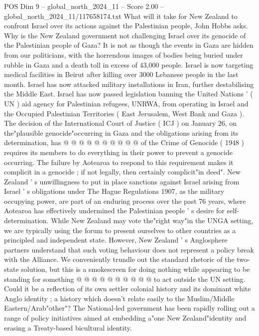 \begin{textsample}{POS Dim 9 – global\_north\_2024\_11 – Score 2.00 – global\_north\_2024\_11/117658174.txt}  \label{ex:f9_pos_238}
What will it take for New Zealand to confront Israel over its actions against the Palestinian people, John Hobbs asks.
Why is the New Zealand government not challenging Israel over its genocide of the Palestinian people of Gaza?
It is not as though the events in Gaza are hidden from our politicians, with the horrendous images of bodies being buried under rubble in Gaza and a death toll in excess of 43,000 people.
Israel is now targeting medical facilities in Beirut after killing over 3000 Lebanese people in the last month.
Israel has now attacked military installations in Iran, further destabilising the Middle East.
Israel has now passed legislation banning the United Nations ' ( UN ) aid agency for Palestinian refugees, UNRWA, from operating in Israel and the Occupied Palestinian Territories ( East Jerusalem, West Bank and Gaza ).
The decision of the International Court of Justice ( ICJ ) on January 26, on the"plausible genocide"occurring in Gaza and the obligations arising from its determination, has @ @ @ @ @ @ @ @ @ @ of the Crime of Genocide ( 1948 ) requires its members to do everything in their power to prevent a genocide occurring.
The failure by Aotearoa to respond to this requirement makes it complicit in a genocide ; if not legally, then certainly complicit"in deed".
New Zealand ' s unwillingness to put in place sanctions against Israel arising from Israel ' s obligations under The Hague Regulations 1907, as the military occupying power, are part of an enduring process over the past 76 years, where Aotearoa has effectively undermined the Palestinian people ' s desire for self-determination.
While New Zealand may vote the"right way"in the UNGA setting, we are typically using the forum to present ourselves to other countries as a principled and independent state.
However, New Zealand ' s Anglosphere partners understand that such voting behaviour does not represent a policy break with the Alliance.
We conveniently trundle out the standard rhetoric of the two-state solution, but this is a smokescreen for doing nothing while appearing to be standing for something @ @ @ @ @ @ @ @ @ @ to act outside the UN setting.
Could it be a reflection of its own settler colonial history and its dominant white Anglo identity ; a history which doesn't relate easily to the Muslim/Middle Eastern/Arab"other"?
The National-led government has been rapidly rolling out a range of policy initiatives aimed at embedding a"one New Zealand"identity and erasing a Treaty-based bicultural identity.

\end{textsample}
